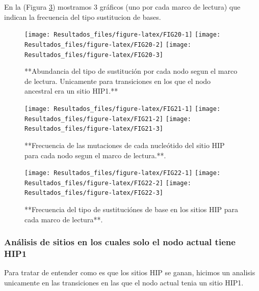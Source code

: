 \documentclass[
]{book}
\begin{document}
En la (Figura \ref{fig:FIG22}) mostramos 3 gráficos (uno por cada marco de lectura) que indican la frecuencia del tipo sustitucion de bases.

\begin{figure}

{\centering \texttt{[image: Resultados\_files/figure-latex/FIG20-1]} \texttt{[image: Resultados\_files/figure-latex/FIG20-2]} \texttt{[image: Resultados\_files/figure-latex/FIG20-3]} 

}

\caption{**Abundancia del tipo de sustitución por cada nodo segun el marco de lectura. Unicamente para transiciones en los que el nodo ancestral era un sitio HIP1.**}\label{fig:FIG20}
\end{figure}

\begin{figure}

{\centering \texttt{[image: Resultados\_files/figure-latex/FIG21-1]} \texttt{[image: Resultados\_files/figure-latex/FIG21-2]} \texttt{[image: Resultados\_files/figure-latex/FIG21-3]} 

}

\caption{**Frecuencia de las mutaciones de cada nucleótido del sitio HIP para cada nodo segun el marco de lectura.**.}\label{fig:FIG21}
\end{figure}

\begin{figure}

{\centering \texttt{[image: Resultados\_files/figure-latex/FIG22-1]} \texttt{[image: Resultados\_files/figure-latex/FIG22-2]} \texttt{[image: Resultados\_files/figure-latex/FIG22-3]} 

}

\caption{**Frecuencia del tipo de sustituciónes de base en los sitios HIP para cada marco de lectura**.}\label{fig:FIG22}
\end{figure}

\hypertarget{anuxe1lisis-de-sitios-en-los-cuales-solo-el-nodo-actual-tiene-hip1}{%
\subsubsection{Análisis de sitios en los cuales solo el nodo actual tiene HIP1}\label{anuxe1lisis-de-sitios-en-los-cuales-solo-el-nodo-actual-tiene-hip1}}

Para tratar de entender como es que los sitios HIP se ganan, hicimos un analisis unicamente en las transiciones en las que el nodo actual tenia un sitio HIP1.
\end{document}
